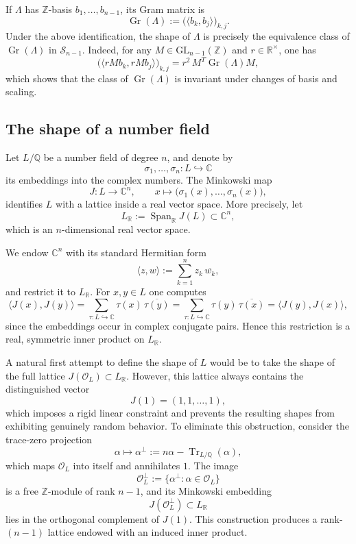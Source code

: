 \documentclass{amsart}
\newcommand{\Q}{\mathbb{Q}}
\newcommand{\C}{\mathbb{C}}
\newcommand{\op}[1]{\operatorname{#1}}
\newcommand{\R}{\mathbb{R}}
\newcommand{\Z}{\mathbb{Z}}
\newcommand{\GL}{\mathrm{GL}}
\newcommand{\cO}{\mathcal{O}}
\newcommand{\Tr}{\operatorname{Tr}}
\theoremstyle{plain}
\theoremstyle{definition}
\theoremstyle{remark}
\numberwithin{equation}{section}
\begin{document}
If $\Lambda$ has $\Z$-basis $b_1,\dots,b_{n-1}$, its Gram matrix is
\[
\op{Gr}(\Lambda):=\bigl(\langle b_k,b_j\rangle\bigr)_{k,j}.
\]
Under the above identification, the shape of $\Lambda$ is precisely the equivalence class of $\op{Gr}(\Lambda)$ in $\mathcal S_{n-1}$. Indeed, for any $M\in \GL_{n-1}(\Z)$ and $r\in \R^\times$, one has
\[
\bigl(\langle rMb_k, rMb_j\rangle\bigr)_{k,j}
=
r^2\, M^T \op{Gr}(\Lambda) M,
\]
which shows that the class of $\op{Gr}(\Lambda)$ is invariant under changes of basis and scaling.

\subsection{The shape of a number field}
\par Let $L/\Q$ be a number field of degree $n$, and denote by
\[
\sigma_1,\dots,\sigma_n : L \hookrightarrow \C
\]
its embeddings into the complex numbers. The Minkowski map
\[
J : L \longrightarrow \C^n, \qquad
x \longmapsto \bigl(\sigma_1(x),\dots,\sigma_n(x)\bigr),
\]
identifies $L$ with a lattice inside a real vector space. More precisely, let
\[
L_\R := \op{Span}_\R J(L) \subset \C^n,
\]
which is an $n$-dimensional real vector space.

We endow $\C^n$ with its standard Hermitian form
\[
\langle z,w\rangle := \sum_{k=1}^n z_k \,\overline{w_k},
\]
and restrict it to $L_\R$. For $x,y\in L$ one computes
\[
\langle J(x),J(y)\rangle
=
\sum_{\tau:L\hookrightarrow\C} \tau(x)\,\overline{\tau(y)}
=
\sum_{\tau:L\hookrightarrow\C} \tau(y)\,\overline{\tau(x)}
=
\langle J(y),J(x)\rangle,
\]
since the embeddings occur in complex conjugate pairs. Hence this restriction is a real, symmetric inner product on $L_\R$.

\par
A natural first attempt to define the shape of $L$ would be to take the shape of the full lattice $J(\cO_L)\subset L_\R$. However, this lattice always contains the distinguished vector
\[
J(1)=(1,1,\dots,1),
\]
which imposes a rigid linear constraint and prevents the resulting shapes from exhibiting genuinely random behavior. To eliminate this obstruction, consider the trace-zero projection
\[
\alpha \longmapsto \alpha^\perp := n\alpha - \Tr_{L/\Q}(\alpha),
\]
which maps $\cO_L$ into itself and annihilates $1$. The image
\[
\cO_L^\perp := \{\alpha^\perp : \alpha\in \cO_L\}
\]
is a free $\Z$-module of rank $n-1$, and its Minkowski embedding
\[
J(\cO_L^\perp) \subset L_\R
\]
lies in the orthogonal complement of $J(1)$. This construction produces a rank-$(n-1)$ lattice endowed with an induced inner product.
\end{document}

